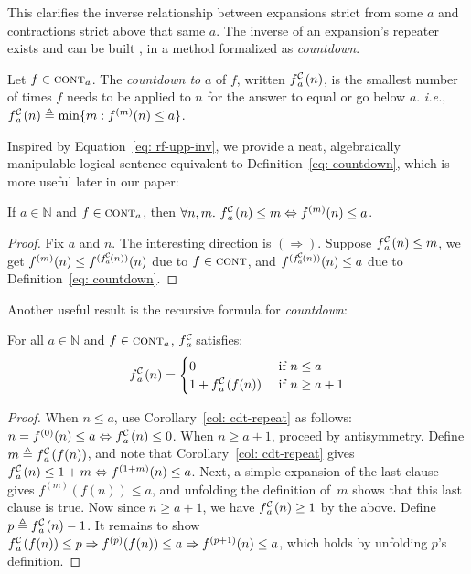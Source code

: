 This clarifies the inverse relationship between expansions strict from some $a$ and contractions strict above that same $a$. The inverse of an expansion's 
repeater exists and can be built , in a method formalized as \emph{countdown}.
\begin{defn} \label{defn: informal-countdown} \label{eq: countdown}
Let $f\in \text{\scshape{cont}}_a$. The \textit{countdown to} $a$ of $f$, written 
$\cdt{f}{a}(n)$, is the smallest number of times $f$ needs to be applied to 
$n$ for the answer to equal or go below $a$. \emph{i.e.}, 
$\cdt{f}{a}(n) \triangleq \min\{m: f^{(m)}(n)\le a \}$.
\end{defn}
Inspired by Equation~\ref{eq: rf-upp-inv}, we provide a neat, algebraically manipulable logical sentence equivalent to Definition~\ref{eq: countdown}, which is more useful later in our paper:
\begin{col} \label{col: cdt-repeat}
If $a \in \mathbb{N}$ and $f\in \text{\scshape{cont}}_{a}$, then $\forall n, m.~ \cdt{f}{a}(n)\le m \iff f^{(m)}(n)\le a$.
\end{col}
\begin{proof}
	Fix $a$ and $n$. The interesting direction is $(\Rightarrow)$. Suppose $\cdt{f}{a}(n)\le m$, we get $f^{(m)}(n)\le f^{(\cdt{f}{a}(n))}(n)$ due to $f\in \text{\scshape{cont}}$, and $f^{(\cdt{f}{a}(n))}(n)\le a$ due to Definition~\ref{eq: countdown}.
\end{proof}
Another useful result is the recursive formula for \emph{countdown}:
\begin{thm} \label{thm: cdt-recursion}
	For all $a\in \mathbb{N}$ and $f\in \text{\scshape{cont}}_{a}$, $\cdt{f}{a}$ satisfies:
	\begin{equation*}
	\cdt{f}{a}(n) = \begin{cases}
	0 & \text{ if } n \le a \\ 1 + \cdt{f}{a}(f(n)) & \text{ if } n \ge a + 1
	\end{cases}
	\end{equation*}
\end{thm}
\begin{proof}
When $n \le a$, use Corollary~\ref{col: cdt-repeat} as follows: 
$n = f^{(0)}(n)\le a \iff \cdt{f}{a}(n)\le 0$. 
When $n\ge a+1$, proceed by antisymmetry. 
Define $m \triangleq \cdt{f}{a}(f(n))$, and note that 
Corollary~\ref{col: cdt-repeat} gives 
$\cdt{f}{a}(n)\le 1+m \iff f^{(1+m)}(n) \le a$.
Next, a simple expansion of the last clause gives $f^{(m)}(f(n)) \le a$,
and unfolding the definition of~$m$ shows that this last clause is true.
Now since $n\ge a+1$, we have $\cdt{f}{a}(n)\ge 1$ by the above. 
Define $p \triangleq \cdt{f}{a}(n) - 1$. 
It remains to show $\cdt{f}{a}(f(n))\le p \Rightarrow f^{(p)}(f(n))\le a \Rightarrow f^{(p+1)}(n)\le a$, which holds by unfolding $p$'s definition.
\end{proof}

